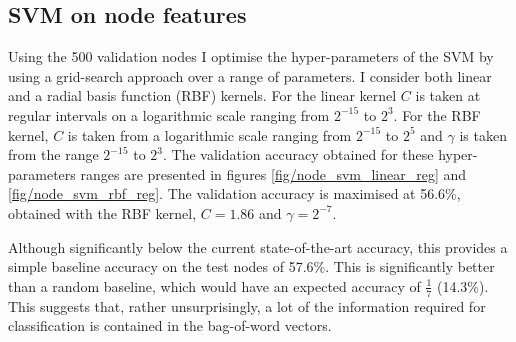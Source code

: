 \documentclass[12pt]{article}
\theoremstyle{definition}
\begin{document}
\subsection{SVM on node features}
Using the 500 validation nodes I optimise the hyper-parameters of the SVM by using a grid-search approach over a range of parameters. I consider both linear and a radial basis function (RBF) kernels. For the linear kernel $C$ is taken at regular intervals on a logarithmic scale ranging from $2^{-15}$ to $2^3$. For the RBF kernel, $C$ is taken from a logarithmic scale ranging from $2^{-15}$ to $2^5$ and $\gamma$ is taken from the range $2^{-15}$ to $2^3$. The validation accuracy obtained for these hyper-parameters ranges are presented in figures \ref{fig/node_svm_linear_reg} and \ref{fig/node_svm_rbf_reg}. The validation accuracy is maximised at 56.6\%, obtained with the RBF kernel, $C=1.86$ and $\gamma=2^{-7}$. 

\bigskip

Although significantly below the current state-of-the-art accuracy, this provides a simple baseline accuracy on the test nodes of 57.6\%. This is significantly better than a random baseline, which would have an expected accuracy of $\frac{1}{7}$ (14.3\%). This suggests that, rather unsurprisingly, a lot of the information required for classification is contained in the bag-of-word vectors. 
\end{document}
